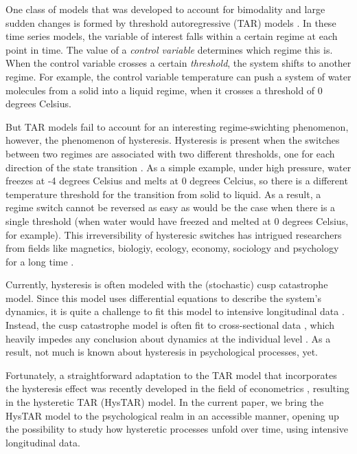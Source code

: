 \documentclass{article}
\begin{document}
One class of models that was developed to account for bimodality and large sudden changes is formed by threshold autoregressive (TAR) models \citep{tar}.
In these time series models, the variable of interest falls within a certain regime at each point in time. 
The value of a \textit{control variable} determines which regime this is. 
When the control variable crosses a certain \textit{threshold}, the system shifts to another regime.
For example, the control variable temperature can push a system of water molecules from a solid into a liquid regime, when it crosses a threshold of 0 degrees Celsius.

But TAR models fail to account for an interesting regime-swichting phenomenon, however, the phenomenon of hysteresis. 
Hysteresis is present when the switches between two regimes are associated with two different thresholds, one for each direction of the state transition \citep{gilmore, strogatz}.
As a simple example, under high pressure, water freezes at -4 degrees Celsius and melts at 0 degrees Celcius, so there is a different temperature threshold for the transition from solid to liquid. As a result, a regime switch cannot be reversed as easy as would be the case when there is a single threshold (when water would have freezed and melted at 0 degrees Celsius, for example).
This irreversibility of hysteresic switches has intrigued researchers from fields like magnetics, biologiy, ecology, economy, sociology and psychology for a long time \citep{hysteresis_mathematical}.

Currently, hysteresis is often modeled with the (stochastic) cusp catastrophe model. Since this model uses differential equations to describe the system's dynamics, it is quite a challenge to fit this model to intensive longitudinal data \citep{cobb, CT_limitations1, CT_limitations2, R_cusp}. 
Instead, the cusp catastrophe model is often fit to cross-sectional data \citep[e.g.,][]{cusp_example_1, cusp_example_2, cusp_example_3}, which heavily impedes any conclusion about dynamics at the individual level \citep{molenaar_manifesto, hamaker_within}.
As a result, not much is known about hysteresis in psychological processes, yet.

Fortunately, a straightforward adaptation to the TAR model that incorporates the hysteresis effect was recently developed in the field of econometrics \citep{bar2}, resulting in the hysteretic TAR (HysTAR) model.
In the current paper, we bring the HysTAR model to the psychological realm in an accessible manner, opening up the possibility to study how hysteretic processes unfold over time, using intensive longitudinal data.
\end{document}
